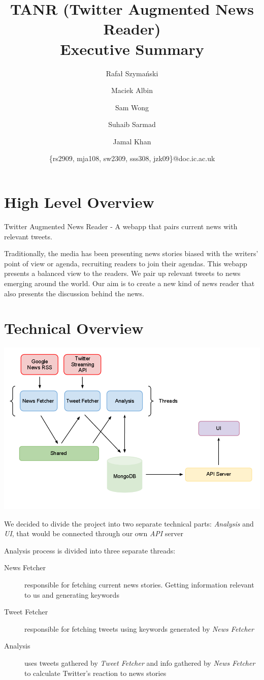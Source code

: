 \documentclass[a4paper,12pt]{article}
\title{TANR (Twitter Augmented News Reader)\\Executive Summary\\}
\author{
    \small{Rafał Szymański}\\
  	\and
    \small{Maciek Albin}\\
    \and
    \small{Sam Wong}\\
    \and  
    \small{Suhaib Sarmad}\\
		\and
		\small{Jamal Khan}\\
		\and
		\small{\{rs2909, mja108, sw2309, sss308, jzk09\}@doc.ic.ac.uk}
		\and
}
\date{}
\begin{document}
 
	\maketitle
	
  \section{High Level Overview}
  
  Twitter Augmented News Reader - A webapp that pairs current news with relevant tweets.
  
  Traditionally, the media has been presenting news stories biased with the writers’ point of view or agenda, recruiting readers to join their agendas. This webapp presents a balanced view to the readers. We pair up relevant tweets to news emerging around the world. Our aim is to create a new kind of news reader that also presents the discussion behind the news. 
  
  \section{Technical Overview}
  \begin{center}
	 \includegraphics[scale=0.2]{infrastructure.png}
 \end{center}
	 
	 	We decided to divide the project into two separate technical parts: \emph{Analysis} and \emph{UI}, that would be connected through our own \emph{API} server
	 	
	 	Analysis process is divided into three separate threads:
  	\begin{description}
  	 \item[News Fetcher] responsible for fetching current news stories. Getting information relevant to us and generating keywords
  	 \item[Tweet Fetcher] responsible for fetching tweets using keywords generated by \emph{News Fetcher}
  	 \item[Analysis] uses tweets gathered by \emph{Tweet Fetcher} and info gathered by \emph{News Fetcher} to calculate Twitter's reaction to news stories
  	\end{description}
	 
\end{document}
